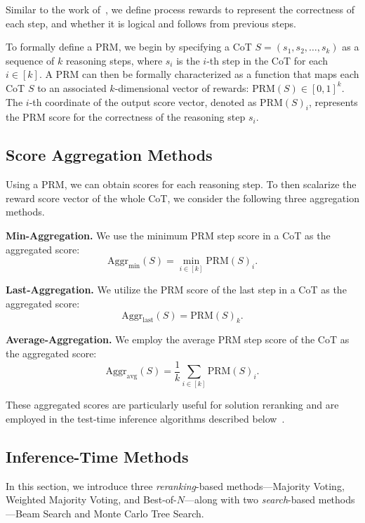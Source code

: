 
Similar to the work of~\citet{lightman2023let},
we define process rewards to represent the correctness of each step, and whether it is logical and follows from previous steps.



To formally define a PRM,
we begin by specifying a CoT $S = (s_1, s_2, \dots, s_k)$ as a sequence of $k$ reasoning steps,
where $s_i$ is the $i$-th step in the CoT for each $i \in [k]$.
A PRM can then be formally characterized as a function that maps each CoT $S$ to an associated $k$-dimensional vector of rewards:
$\text{PRM}(S) \in [0,1]^k$.
The $i$-th coordinate of the output score vector, denoted as $\text{PRM}(S)_i$, represents the PRM score for the correctness of the reasoning step $s_i$.

\subsection{Score Aggregation Methods}

Using a PRM, we can obtain scores for each reasoning step.
To then scalarize the reward score vector of the whole CoT, we consider the following three aggregation methods.

\textbf{Min-Aggregation.}
We use the minimum PRM step score in a CoT as the aggregated score:
\[\text{Aggr}_\text{min} (S) = \min_{i\in[k]} \text{PRM}(S)_i.\]

\textbf{Last-Aggregation.}
We utilize the PRM score of the last step in a CoT as the aggregated score:
\[\text{Aggr}_\text{last} (S) = \text{PRM}(S)_k.\]

\textbf{Average-Aggregation.}
We employ the average PRM step score of the CoT as the aggregated score:
\[\text{Aggr}_\text{avg} (S) = \frac{1}{k}\sum_{i\in[k]}\text{PRM}(S)_i.\]


These aggregated scores are particularly useful for solution reranking and are employed in the test-time inference algorithms described below~\citep{wang2024math,sun2024easy,lightman2023let}.


\subsection{Inference-Time Methods}\label{sec:inference-time-methods}

In this section, we introduce three \emph{reranking}-based methods—Majority Voting, Weighted Majority Voting, and Best-of-$N$—along with two \emph{search}-based methods—Beam Search and Monte Carlo Tree Search.

